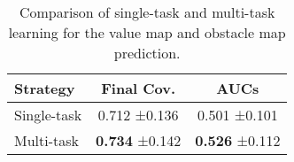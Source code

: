 \begin{wraptable}{l}{0.4\textwidth}  %
\vspace{-0.8em}
\caption{Comparison of single-task and multi-task learning for the value map and obstacle map prediction.}
%
\centering
\tabcolsep=0.07cm

\begin{tabular}{lcc}
\toprule
\textbf{Strategy} & \textbf{Final Cov.} & \textbf{AUCs} \\
\midrule
Single-task & 0.712 \tiny{±0.136} & 0.501 \tiny{±0.101} \\
Multi-task & \textbf{0.734} \tiny{±0.142} & \textbf{0.526} \tiny{±0.112} \\
\bottomrule
\end{tabular}%


\label{tab:ablation_multi_unseen}
\vspace{-1em}
\end{wraptable}